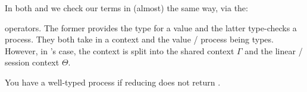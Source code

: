 In both  and  we check our terms in (almost) the same way, via the:
\bi
    \item {}
    \item {}
\ei

operators. The former provides the type for a value and the latter type-checks a process.
They both take in a context and the value / process being types. However, in 's case, the context is split into the shared context $\Gamma$ and the linear / session context $\Theta$.

You have a well-typed process if reducing  does not return .